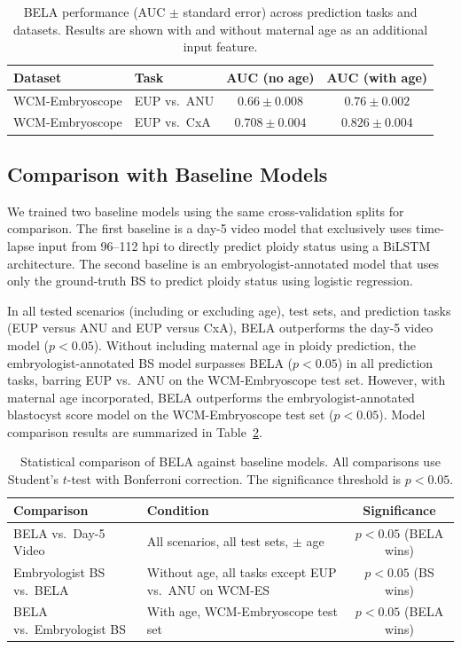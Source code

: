 \documentclass[12pt]{article}
\begin{document}
\begin{table}[H]
\centering
\caption{BELA performance (AUC $\pm$ standard error) across prediction tasks and datasets. Results are shown with and without maternal age as an additional input feature.}
\label{tab:performance}
\begin{tabular}{llcc}
\toprule
\textbf{Dataset} & \textbf{Task} & \textbf{AUC (no age)} & \textbf{AUC (with age)} \\
\midrule
WCM-Embryoscope & EUP vs.\ ANU & $0.66 \pm 0.008$ & $0.76 \pm 0.002$ \\
WCM-Embryoscope & EUP vs.\ CxA & $0.708 \pm 0.004$ & $0.826 \pm 0.004$ \\
\bottomrule
\end{tabular}
\end{table}

\subsection{Comparison with Baseline Models}

We trained two baseline models using the same cross-validation splits for comparison. The first baseline is a day-5 video model that exclusively uses time-lapse input from 96--112 hpi to directly predict ploidy status using a BiLSTM architecture. The second baseline is an embryologist-annotated model that uses only the ground-truth BS to predict ploidy status using logistic regression.

In all tested scenarios (including or excluding age), test sets, and prediction tasks (EUP versus ANU and EUP versus CxA), BELA outperforms the day-5 video model ($p < 0.05$). Without including maternal age in ploidy prediction, the embryologist-annotated BS model surpasses BELA ($p < 0.05$) in all prediction tasks, barring EUP vs.\ ANU on the WCM-Embryoscope test set. However, with maternal age incorporated, BELA outperforms the embryologist-annotated blastocyst score model on the WCM-Embryoscope test set ($p < 0.05$). Model comparison results are summarized in Table~\ref{tab:comparison}.

\begin{table}[H]
\centering
\caption{Statistical comparison of BELA against baseline models. All comparisons use Student's $t$-test with Bonferroni correction. The significance threshold is $p < 0.05$.}
\label{tab:comparison}
\begin{tabular}{lp{5cm}c}
\toprule
\textbf{Comparison} & \textbf{Condition} & \textbf{Significance} \\
\midrule
BELA vs.\ Day-5 Video & All scenarios, all test sets, $\pm$ age & $p < 0.05$ (BELA wins) \\
Embryologist BS vs.\ BELA & Without age, all tasks except EUP vs.\ ANU on WCM-ES & $p < 0.05$ (BS wins) \\
BELA vs.\ Embryologist BS & With age, WCM-Embryoscope test set & $p < 0.05$ (BELA wins) \\
\bottomrule
\end{tabular}
\end{table}
\end{document}
